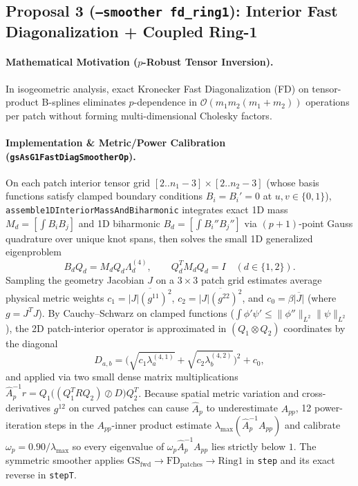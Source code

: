 \documentclass[10pt,a4paper]{article}
\begin{document}
\subsection{Proposal 3 (\texttt{--smoother fd\_ring1}): Interior Fast Diagonalization + Coupled Ring-1}
\paragraph{Mathematical Motivation ($p$-Robust Tensor Inversion).}
In isogeometric analysis, exact Kronecker Fast Diagonalization (FD) on tensor-product B-splines eliminates $p$-dependence in $\mathcal{O}(m_1 m_2(m_1 + m_2))$ operations per patch without forming multi-dimensional Cholesky factors.

\paragraph{Implementation \& Metric/Power Calibration (\texttt{gsAsG1FastDiagSmootherOp}).}
On each patch interior tensor grid $[2..n_1-3] \times [2..n_2-3]$ (whose basis functions satisfy clamped boundary conditions $B_i = B_i' = 0$ at $u,v \in \{0,1\}$), \texttt{assemble1DInteriorMassAndBiharmonic} integrates exact 1D mass $M_d = [\int B_i B_j]$ and 1D biharmonic $B_d = [\int B_i'' B_j'']$ via $(p+1)$-point Gauss quadrature over unique knot spans, then solves the small 1D generalized eigenproblem
\[
  B_d Q_d = M_d Q_d \Lambda_d^{(4)}, \qquad Q_d^T M_d Q_d = I \quad (d \in \{1, 2\}).
\]
Sampling the geometry Jacobian $J$ on a $3\times 3$ patch grid estimates average physical metric weights $c_1 = \overline{|J|(g^{11})^2}$, $c_2 = \overline{|J|(g^{22})^2}$, and $c_0 = \beta\overline{|J|}$ (where $g = J^T J$). By Cauchy--Schwarz on clamped functions ($\int \phi'\psi' \le \|\phi''\|_{L^2}\|\psi\|_{L^2}$), the 2D patch-interior operator is approximated in $(Q_1 \otimes Q_2)$ coordinates by the diagonal
\[
  D_{a,b} = \Big(\sqrt{c_1 \lambda_a^{(4,1)}} + \sqrt{c_2 \lambda_b^{(4,2)}}\Big)^2 + c_0,
\]
and applied via two small dense matrix multiplications $\hat{A}_p^{-1} r = Q_1 \big((Q_1^T R Q_2) \oslash D\big) Q_2^T$. Because spatial metric variation and cross-derivatives $g^{12}$ on curved patches can cause $\hat{A}_p$ to underestimate $A_{pp}$, 12 power-iteration steps in the $A_{pp}$-inner product estimate $\lambda_{\max}(\hat{A}_p^{-1} A_{pp})$ and calibrate $\omega_p = 0.90/\lambda_{\max}$ so every eigenvalue of $\omega_p \hat{A}_p^{-1} A_{pp}$ lies strictly below $1$. The symmetric smoother applies $\text{GS}_{\text{fwd}} \to \text{FD}_{\text{patches}} \to \text{Ring1}$ in \texttt{step} and its exact reverse in \texttt{stepT}.
\end{document}
